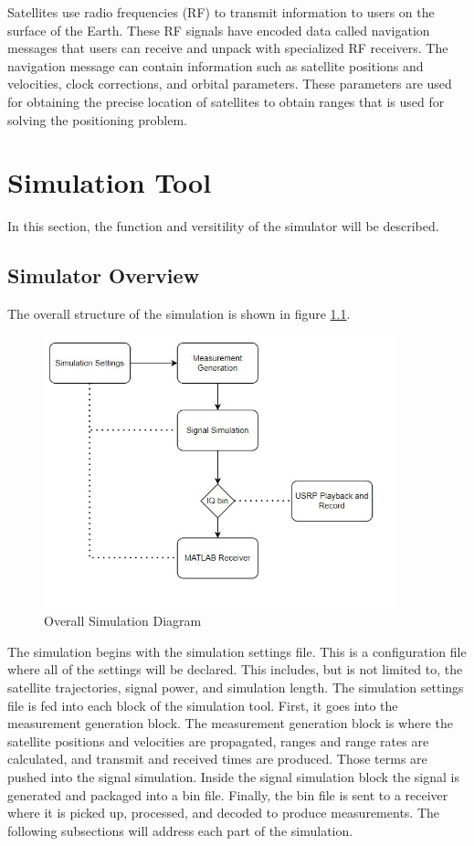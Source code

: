 \documentclass[12pt]{report}
\begin{document}
Satellites use radio frequencies (RF) to transmit information to users on the surface of the Earth. These RF signals have encoded data called navigation messages that users can receive and unpack with specialized RF receivers. The navigation message can contain information such as satellite positions and velocities, clock corrections, and orbital parameters. These parameters are used for obtaining the precise location of satellites to obtain ranges that is used for solving the positioning problem. 

\chapter {Simulation Tool}
In this section, the function and versitility of the simulator will be described.

\section{Simulator Overview}

The overall structure of the simulation is shown in figure \ref{fig:SimDiagram}.
\begin{figure}[ht]
    \centering
    \includegraphics[width=4.0in]{OverallSimulationDiagram}
    \caption{Overall Simulation Diagram}
    \label{fig:SimDiagram}
\end{figure}

The simulation begins with the simulation settings file. This is a configuration file where all of the settings will be declared. This includes, but is not limited to, the satellite trajectories, signal power, and simulation length. The simulation settings file is fed into each block of the simulation tool. First, it goes into the measurement generation block. The measurement generation block is where the satellite positions and velocities are propagated, ranges and range rates are calculated, and transmit and received times are produced. Those terms are pushed into the signal simulation. Inside the signal simulation block the signal is generated and packaged into a bin file. Finally, the bin file is sent to a receiver where it is picked up, processed, and decoded to produce measurements. The following subsections will address each part of the simulation.
\end{document}
